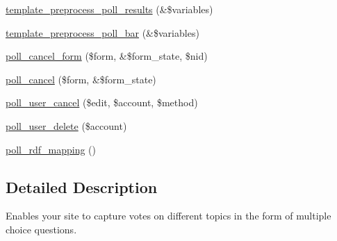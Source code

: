 \begin{DoxyCompactItemize}
\hyperlink{poll_8module_a4797e0810a85deacc6dcc9bedf24d235}{template\_\-preprocess\_\-poll\_\-results} (\&\$variables)
\item 
\hyperlink{poll_8module_a65f1b1e0fa803234fe9cde359e79a824}{template\_\-preprocess\_\-poll\_\-bar} (\&\$variables)
\item 
\hyperlink{group__forms_ga15cf9694bfdb20243340a8c7168d441c}{poll\_\-cancel\_\-form} (\$form, \&\$form\_\-state, \$nid)
\item 
\hyperlink{poll_8module_aa61fb956921bdbfc96b8bc5de349909f}{poll\_\-cancel} (\$form, \&\$form\_\-state)
\item 
\hyperlink{poll_8module_ae5fc3d7e946c2b8984b6ba2c0f19874e}{poll\_\-user\_\-cancel} (\$edit, \$account, \$method)
\item 
\hyperlink{poll_8module_aa41b1c9cea9d13a9da3eecc49d555dda}{poll\_\-user\_\-delete} (\$account)
\item 
\hyperlink{poll_8module_a06fc139d4b3f04776fc8200ce19b8701}{poll\_\-rdf\_\-mapping} ()
\end{DoxyCompactItemize}


\subsection{Detailed Description}
Enables your site to capture votes on different topics in the form of multiple choice questions. 

